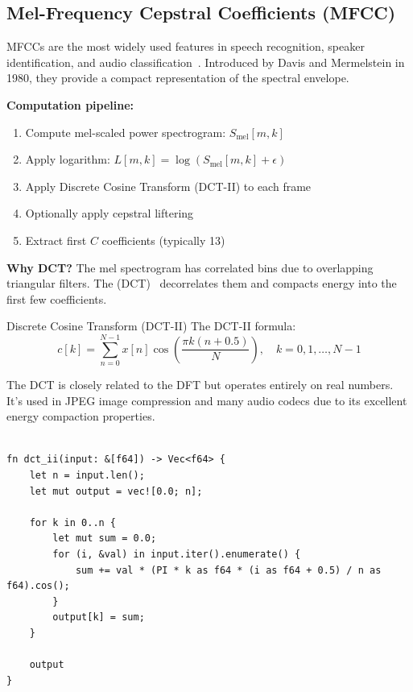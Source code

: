 \subsection{Mel-Frequency Cepstral Coefficients (MFCC)}\label{subsec:mfcc}

MFCCs are the most widely used features in speech recognition,
speaker identification, and audio
classification~\cite{davis1980comparison,rabiner1993fundamentals}.
Introduced by Davis and Mermelstein in 1980, they provide a compact
representation of the spectral envelope.

\textbf{Computation pipeline:}

\begin{enumerate}
  \item Compute mel-scaled power spectrogram: $S_{\text{mel}}[m, k]$
  \item Apply logarithm: $L[m, k] = \log(S_{\text{mel}}[m, k] + \epsilon)$
  \item Apply Discrete Cosine Transform (DCT-II) to each frame
  \item Optionally apply cepstral liftering
  \item Extract first $C$ coefficients (typically 13)
\end{enumerate}

\textbf{Why DCT?} The mel spectrogram has correlated bins due to
overlapping triangular filters. The  (DCT)~\cite{ahmed2006discrete} decorrelates them and
compacts energy into the first few coefficients.

\begin{concept}{Discrete Cosine Transform (DCT-II)}
  The DCT-II formula:
  \begin{equation}
    \label{eq:dct_ii}
    c[k] = \sum_{n=0}^{N-1} x[n] \cos\left(\frac{\pi k(n +
    0.5)}{N}\right), \quad k = 0, 1, \ldots, N-1
  \end{equation}

  The DCT is closely related to the DFT but operates entirely on real
  numbers. It's used in JPEG image compression and many audio codecs
  due to its excellent energy compaction properties.
\end{concept}

\begin{lstlisting}[caption={DCT-II implementation for MFCC cepstral step}]

fn dct_ii(input: &[f64]) -> Vec<f64> {
    let n = input.len();
    let mut output = vec![0.0; n];

    for k in 0..n {
        let mut sum = 0.0;
        for (i, &val) in input.iter().enumerate() {
            sum += val * (PI * k as f64 * (i as f64 + 0.5) / n as f64).cos();
        }
        output[k] = sum;
    }

    output
}
\end{lstlisting}

